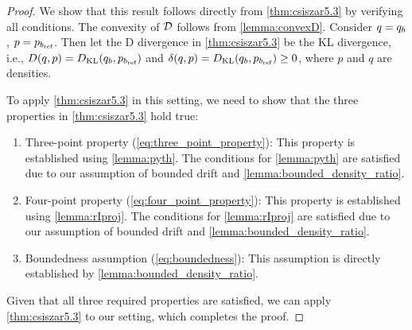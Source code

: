 \begin{proof}
We show that this result follows directly from \cref{thm:csiszar5.3} by verifying all conditions. The convexity of $\mathcal{D}$ follows from \cref{lemma:convexD}. Consider $ q = \bridge_{\modeldrift}$, $p = \refden_{\refdrift}$. Then let the D divergence in \cref{thm:csiszar5.3} be the KL divergence, i.e., $D(q,p) = \KL(\bridge_{\modeldrift},\refden_{\refdrift})$ and $\delta(q,p) = \KL(\bridge_{\modeldrift},\refden_{\refdrift}) \ge 0$, where $p$ and $q$ are densities.

To apply \cref{thm:csiszar5.3} in this setting, we need to show that the three properties in \cref{thm:csiszar5.3} hold true:

\begin{enumerate}
    \item Three-point property (\cref{eq:three_point_property}):
    This property is established using \cref{lemma:pyth}. The conditions for \cref{lemma:pyth} are satisfied due to our assumption of bounded drift and \cref{lemma:bounded_density_ratio}.

    \item Four-point property (\cref{eq:four_point_property}):
    This property is established using \cref{lemma:rIproj}. The conditions for \cref{lemma:rIproj} are satisfied due to our assumption of bounded drift and \cref{lemma:bounded_density_ratio}.


    \item Boundedness assumption (\cref{eq:boundedness}):
    This assumption is directly established by \cref{lemma:bounded_density_ratio}.
\end{enumerate}

Given that all three required properties are satisfied, we can apply \cref{thm:csiszar5.3} to our setting, which completes the proof.
\end{proof}

